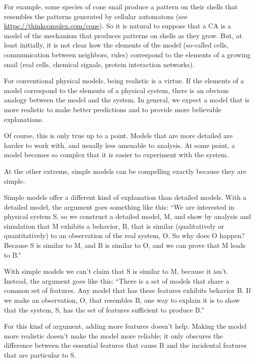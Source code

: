 \documentclass[12pt]{book}
\theoremstyle{exercise}
\begin{document}

For example, some species of cone snail produce a pattern on their
shells that resembles the patterns generated by cellular automatons
(see \url{https://thinkcomplex.com/cone}).  So it is natural to
suppose that a CA is a model of the mechanism that produces patterns
on shells as they grow.  But, at least initially, it is not clear how
the elements of the model (so-called cells, communication between
neighbors, rules) correspond to the elements of a growing snail (real
cells, chemical signals, protein interaction networks).


For conventional physical models, being realistic is a virtue.  If the elements of a model correspond to the elements of a physical system, there is an obvious analogy between the model and the system.  In general, we expect a model that is more realistic to make better predictions and to provide more believable
explanations.


Of course, this is only true up to a point.  Models that are
more detailed are harder to work with, and usually less
amenable to analysis.  At some point, a model becomes so complex
that it is easier to experiment with the system.

At the other extreme, simple models can be compelling exactly because
they are simple.

Simple models offer a different kind of explanation than detailed
models.  With a detailed model, the argument goes something
like this: ``We are interested in physical system S, so we
construct a detailed model, M, and show by analysis and simulation
that M exhibits a behavior, B, that is similar (qualitatively
or quantitatively) to an observation of the real system, O.
So why does O happen?  Because S is similar to M, and
B is similar to O, and we can prove that M leads to B.''


With simple models we can't claim that S is similar to M, because it
isn't.  Instead, the argument goes like this: ``There is a set of models
that share a common set of features.  Any model that has these
features exhibits behavior B.  If we make an observation, O, that
resembles B, one way to explain it is to show that the system, S, has
the set of features sufficient to produce B.''

For this kind of argument, adding more features doesn't help.  Making
the model more realistic doesn't make the model more reliable; it only
obscures the difference between the essential features that cause B
and the incidental features that are particular to S.
\end{document}
